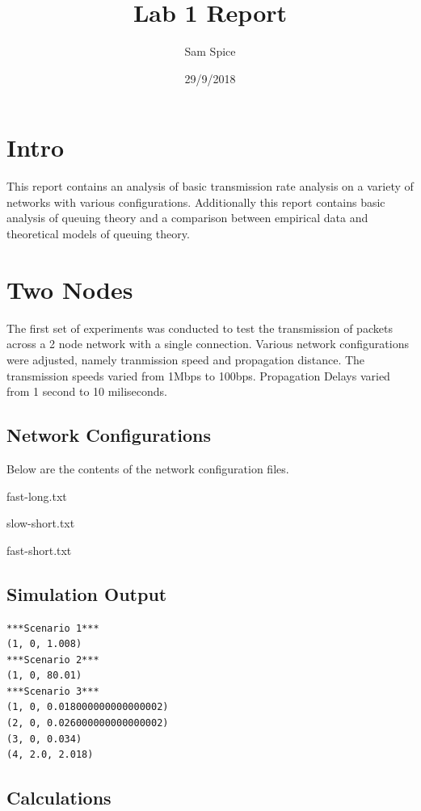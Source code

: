 \documentclass[12pt]{article}
\title{Lab 1 Report}
\author{Sam Spice}
\date{29/9/2018}
\begin{document}
\maketitle

\section{Intro}

This report contains an analysis of basic transmission rate analysis on a variety of networks with various configurations. Additionally this report contains basic analysis of queuing theory and a comparison between empirical data and theoretical models of queuing theory.

\section{Two Nodes}
The first set of experiments was conducted to test the transmission of packets across a 2 node network with a single connection. Various network configurations were adjusted, namely tranmission speed and propagation distance. The transmission speeds varied from 1Mbps to 100bps. Propagation Delays varied from 1 second to 10 miliseconds.

\subsection{Network Configurations}

Below are the contents of the network configuration files.
\linebreak
\centerline{fast-long.txt}


\centerline{slow-short.txt}


\centerline{fast-short.txt}


\subsection{Simulation Output}
\begin{verbatim}
***Scenario 1***
(1, 0, 1.008)
***Scenario 2***
(1, 0, 80.01)
***Scenario 3***
(1, 0, 0.018000000000000002)
(2, 0, 0.026000000000000002)
(3, 0, 0.034)
(4, 2.0, 2.018)
\end{verbatim}

\subsection{Calculations}
\end{document}
